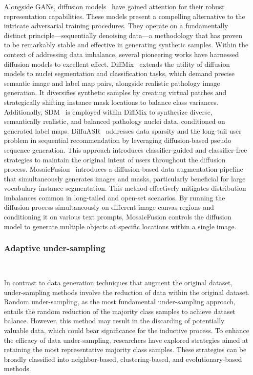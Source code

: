 Alongside GANs, diffusion models~\cite{ho2020denoising,wang2022semantic} have gained attention for their robust representation capabilities. These models present a compelling alternative to the intricate adversarial training procedures. They operate on a fundamentally distinct principle—sequentially denoising data—a methodology that has proven to be remarkably stable and effective in generating synthetic samples. Within the context of addressing data imbalance, several pioneering works have harnessed diffusion models to excellent effect.
DiffMix~\cite{oh2023diffmix} extends the utility of diffusion models to nuclei segmentation and classification tasks, which demand precise semantic image and label map pairs, alongside realistic pathology image generation. It diversifies synthetic samples by creating virtual patches and strategically shifting instance mask locations to balance class variances. Additionally, SDM~\cite{wang2022semantic} is employed within DiffMix to synthesize diverse, semantically realistic, and balanced pathology nuclei data, conditioned on generated label maps.
DiffuASR~\cite{liu2023diffusion} addresses data sparsity and the long-tail user problem in sequential recommendation by leveraging diffusion-based pseudo sequence generation. This approach introduces classifier-guided and classifier-free strategies to maintain the original intent of users throughout the diffusion process.
MosaicFusion~\cite{xie2023mosaicfusion} introduces a diffusion-based data augmentation pipeline that simultaneously generates images and masks, particularly beneficial for large vocabulary instance segmentation. This method effectively mitigates distribution imbalances common in long-tailed and open-set scenarios. By running the diffusion process simultaneously on different image canvas regions and conditioning it on various text prompts, MosaicFusion controls the diffusion model to generate multiple objects at specific locations within a single image.








\subsubsection{Adaptive under-sampling}\
\label{s312}

In contrast to data generation techniques that augment the original dataset, under-sampling methods involve the reduction of data within the original dataset. Random under-sampling, as the most fundamental under-sampling approach, entails the random reduction of the majority class samples to achieve dataset balance. However, this method may result in the discarding of potentially valuable data, which could bear significance for the inductive process. To enhance the efficacy of data under-sampling, researchers have explored strategies aimed at retaining the most representative majority class samples. These strategies can be broadly classified into neighbor-based, clustering-based, and evolutionary-based methods.

